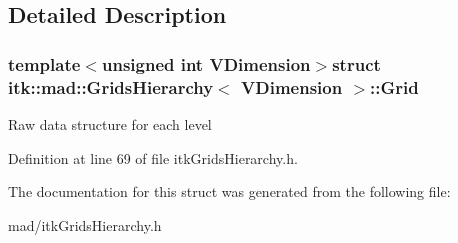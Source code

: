 \subsection{Detailed Description}
\subsubsection*{template$<$unsigned int V\-Dimension$>$struct itk\-::mad\-::\-Grids\-Hierarchy$<$ V\-Dimension $>$\-::\-Grid}

Raw data structure for each level 

Definition at line 69 of file itk\-Grids\-Hierarchy.\-h.



The documentation for this struct was generated from the following file\-:\begin{DoxyCompactItemize}
\item 
mad/itk\-Grids\-Hierarchy.\-h\end{DoxyCompactItemize}
